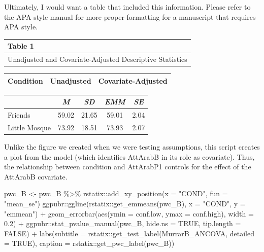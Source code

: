 \documentclass[
  11pt,
]{book}
\newenvironment{Shaded}{\begin{snugshade}}{\end{snugshade}}
\newcommand{\AttributeTok}[1]{\textcolor[rgb]{0.77,0.63,0.00}{#1}}
\newcommand{\ConstantTok}[1]{\textcolor[rgb]{0.00,0.00,0.00}{#1}}
\newcommand{\FloatTok}[1]{\textcolor[rgb]{0.00,0.00,0.81}{#1}}
\newcommand{\FunctionTok}[1]{\textcolor[rgb]{0.00,0.00,0.00}{#1}}
\newcommand{\NormalTok}[1]{#1}
\newcommand{\OtherTok}[1]{\textcolor[rgb]{0.56,0.35,0.01}{#1}}
\newcommand{\SpecialCharTok}[1]{\textcolor[rgb]{0.00,0.00,0.00}{#1}}
\newcommand{\StringTok}[1]{\textcolor[rgb]{0.31,0.60,0.02}{#1}}
\begin{document}
Ultimately, I would want a table that included this information. Please refer to the APA style manual for more proper formatting for a manuscript that requires APA style.

\begin{longtable}[]{@{}l@{}}
\toprule()
Table 1 \\
\midrule()
\endhead
Unadjusted and Covariate-Adjusted Descriptive Statistics \\
\bottomrule()
\end{longtable}

\begin{longtable}[]{@{}lcc@{}}
\toprule()
Condition & Unadjusted & Covariate-Adjusted \\
\midrule()
\endhead
\bottomrule()
\end{longtable}

\begin{longtable}[]{@{}lcccc@{}}
\toprule()
& \emph{M} & \emph{SD} & \emph{EMM} & \emph{SE} \\
\midrule()
\endhead
Friends & 59.02 & 21.65 & 59.01 & 2.04 \\
Little Mosque & 73.92 & 18.51 & 73.93 & 2.07 \\
\bottomrule()
\end{longtable}

Unlike the figure we created when we were testing assumptions, this script creates a plot from the model (which identifies AttArabB in its role as covariate). Thus, the relationship between condition and AttArabP1 controls for the effect of the AttArabB covariate.

\begin{Shaded}
\begin{Highlighting}[]
\NormalTok{pwc\_B }\OtherTok{\textless{}{-}}\NormalTok{ pwc\_B }\SpecialCharTok{\%\textgreater{}\%}
\NormalTok{    rstatix}\SpecialCharTok{::}\FunctionTok{add\_xy\_position}\NormalTok{(}\AttributeTok{x =} \StringTok{"COND"}\NormalTok{, }\AttributeTok{fun =} \StringTok{"mean\_se"}\NormalTok{)}
\NormalTok{ggpubr}\SpecialCharTok{::}\FunctionTok{ggline}\NormalTok{(rstatix}\SpecialCharTok{::}\FunctionTok{get\_emmeans}\NormalTok{(pwc\_B), }\AttributeTok{x =} \StringTok{"COND"}\NormalTok{, }\AttributeTok{y =} \StringTok{"emmean"}\NormalTok{) }\SpecialCharTok{+}
    \FunctionTok{geom\_errorbar}\NormalTok{(}\FunctionTok{aes}\NormalTok{(}\AttributeTok{ymin =}\NormalTok{ conf.low, }\AttributeTok{ymax =}\NormalTok{ conf.high), }\AttributeTok{width =} \FloatTok{0.2}\NormalTok{) }\SpecialCharTok{+}
\NormalTok{    ggpubr}\SpecialCharTok{::}\FunctionTok{stat\_pvalue\_manual}\NormalTok{(pwc\_B, }\AttributeTok{hide.ns =} \ConstantTok{TRUE}\NormalTok{, }\AttributeTok{tip.length =} \ConstantTok{FALSE}\NormalTok{) }\SpecialCharTok{+}
    \FunctionTok{labs}\NormalTok{(}\AttributeTok{subtitle =}\NormalTok{ rstatix}\SpecialCharTok{::}\FunctionTok{get\_test\_label}\NormalTok{(MurrarB\_ANCOVA, }\AttributeTok{detailed =} \ConstantTok{TRUE}\NormalTok{),}
        \AttributeTok{caption =}\NormalTok{ rstatix}\SpecialCharTok{::}\FunctionTok{get\_pwc\_label}\NormalTok{(pwc\_B))}
\end{Highlighting}
\end{Shaded}
\end{document}
